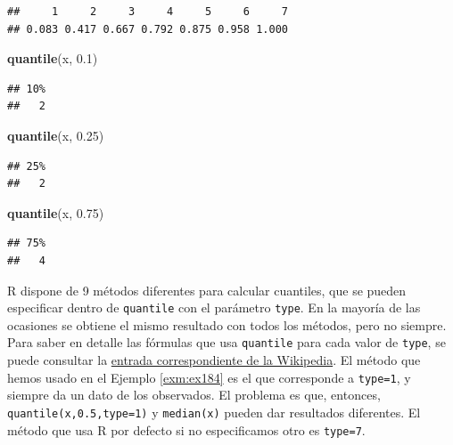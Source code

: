 \documentclass[]{book}
\newenvironment{Shaded}{\begin{snugshade}}{\end{snugshade}}
\newcommand{\FloatTok}[1]{\textcolor[rgb]{0.00,0.00,0.81}{#1}}
\newcommand{\KeywordTok}[1]{\textcolor[rgb]{0.13,0.29,0.53}{\textbf{#1}}}
\newcommand{\NormalTok}[1]{#1}
\theoremstyle{definition}
\theoremstyle{definition}
\theoremstyle{definition}
\theoremstyle{remark}
\begin{document}
\begin{verbatim}
##     1     2     3     4     5     6     7 
## 0.083 0.417 0.667 0.792 0.875 0.958 1.000
\end{verbatim}

\begin{Shaded}
\begin{Highlighting}[]
\KeywordTok{quantile}\NormalTok{(x, }\FloatTok{0.1}\NormalTok{)}
\end{Highlighting}
\end{Shaded}

\begin{verbatim}
## 10% 
##   2
\end{verbatim}

\begin{Shaded}
\begin{Highlighting}[]
\KeywordTok{quantile}\NormalTok{(x, }\FloatTok{0.25}\NormalTok{)}
\end{Highlighting}
\end{Shaded}

\begin{verbatim}
## 25% 
##   2
\end{verbatim}

\begin{Shaded}
\begin{Highlighting}[]
\KeywordTok{quantile}\NormalTok{(x, }\FloatTok{0.75}\NormalTok{)}
\end{Highlighting}
\end{Shaded}

\begin{verbatim}
## 75% 
##   4
\end{verbatim}

R dispone de 9 métodos diferentes para calcular cuantiles, que se pueden especificar dentro de \texttt{quantile} con el parámetro \texttt{type}. En la mayoría de las ocasiones se obtiene el mismo resultado con todos los métodos, pero no siempre. Para saber en detalle las fórmulas que usa \texttt{quantile} para cada valor de \texttt{type}, se puede consultar la \href{http://en.wikipedia.org/wiki/quantile}{entrada correspondiente de la Wikipedia}. El método que hemos usado en el Ejemplo \ref{exm:ex184} es el que corresponde a \texttt{type=1}, y siempre da un dato de los observados. El problema es que, entonces, \texttt{quantile(x,0.5,type=1)} y \texttt{median(x)} pueden dar resultados diferentes. El método que usa R por defecto si no especificamos otro es \texttt{type=7}.
\end{document}
